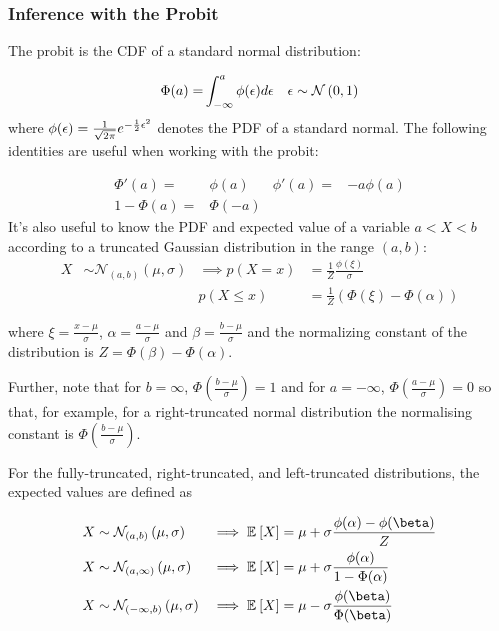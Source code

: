 \subsubsection{Inference with the Probit}
The probit is the CDF of a standard normal distribution:

\begin{align}
\Phi(a) = & \int_{-\infty}^{a} \phi(\epsilon) d\epsilon & \epsilon \sim \mathcal{N} \left( {0}, {1} \right)
\end{align}
where $\phi(\epsilon) = \frac{1}{\sqrt{2\pi}} e^{-\frac{1}{2} \epsilon ^2}$ denotes the PDF of a standard normal. The following identities are useful when working with the probit:

\begin{align}
    \Phi'(a) = & \phi(a)  & \phi'(a) = & -a \phi(a) \\
    1 - \Phi(a) = & \Phi(-a) & \text{ } & \text{ }
  \label{eqn:probit-identities}
\end{align}
It's also useful to know the PDF and expected value of a variable $a < X < b$ according to a truncated Gaussian distribution in the range $(a,b)$:
\begin{align}
X & \sim \mathcal{N}_{(a,b)}\left(\mu, \sigma \right) & \implies p(X = x) & = \frac{1}{Z} \frac{\phi (\xi)}{\sigma} \\
 & & p(X \leq x) & = \frac{1}{Z} \left( \Phi(\xi) - \Phi(\alpha)\right)
\end{align}

where $\xi = \frac{x - \mu}{\sigma}$, $\alpha = \frac{a - \mu}{\sigma}$ and $\beta = \frac{b - \mu}{\sigma}$ and the normalizing constant of the distribution is $Z = \Phi(\beta) - \Phi(\alpha)$. 

Further, note that for $b = \infty$, $\Phi(\frac{b-\mu}{\sigma}) = 1$ and for $a = -\infty$, $\Phi(\frac{a-\mu}{\sigma}) = 0$ so that, for example, for a right-truncated normal distribution the normalising constant is $\Phi(\frac{b - \mu}{\sigma})$.

For the fully-truncated, right-truncated, and left-truncated distributions, the expected values are defined as

\begin{align}
X & \sim \mathcal{N}_{(a,b)}\left(\mu, \sigma \right) & \implies \ex{X}{} & = \mu + \sigma \frac{\phi(\alpha) - \phi(\beta)}{Z} \label{eqn:full-trunc-mean} \\ 
X & \sim \mathcal{N}_{(a,\infty)}\left(\mu, \sigma \right) & \implies \ex{X}{} & = \mu + \sigma \frac{\phi(\alpha)}{1 - \Phi(\alpha)} \label{eqn:left-trunc-mean} \\
X & \sim \mathcal{N}_{(-\infty,b)}\left(\mu, \sigma \right) & \implies \ex{X}{} & = \mu - \sigma\frac{\phi(\beta)}{\Phi(\beta)} \label{eqn:right-trunc-mean}
\end{align}


